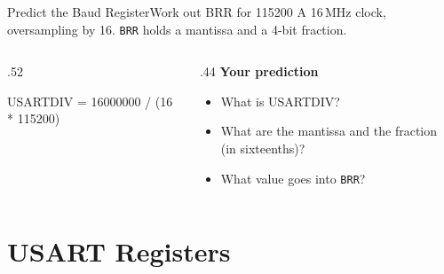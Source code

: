 \documentclass[9pt,aspectratio=169,xcolor=table]{beamer}
\begin{document}
{\beamerextras
\begin{frame}[fragile]{Predict the Baud Register}{Work out BRR for 115200}
    \leavevmode
    A 16\,MHz clock, oversampling by 16. \texttt{BRR} holds a mantissa and a 4-bit fraction.

    \vspace{2mm}
    \begin{columns}[T]
    \begin{column}{.52\textwidth}
\begin{cc}[basicstyle=\ttfamily\small]
USARTDIV = 16000000 / (16 * 115200)
\end{cc}
    \end{column}
    \begin{column}{.44\textwidth}
        \textbf{Your prediction}
        {\small
        \begin{itemize}\itemsep2pt
            \item What is USARTDIV?
            \item What are the mantissa and the fraction (in sixteenths)?
            \item What value goes into \texttt{BRR}?
        \end{itemize}}
    \end{column}
    \end{columns}

    \vspace{2mm}
\end{frame}
}


\section{USART Registers}
\end{document}
